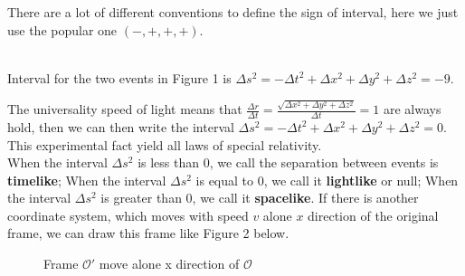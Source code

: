 \documentclass[12pt]{article}
\theoremstyle{mystyle}{\newtheorem{definition}{Definition}[section]}
\theoremstyle{mystyle}{\newtheorem{theorem}[definition]{Theorem}}
\theoremstyle{mystyle}{\newtheorem*{remark}{Remark}}
\theoremstyle{mystyle}{\newtheorem*{example}{Example}}
\theoremstyle{mystyle}{\newtheorem*{examples}{Examples}}
\theoremstyle{cstyle}{\newtheorem*{cthm}{}}
\begin{document}
\begin{remark}\leavevmode
  There are a lot of different conventions to define the sign of interval, here we just use the popular one \((-,+,+,+)\).
\end{remark}
\begin{example}\leavevmode %
  \\Interval for the two events in Figure 1 is $\Delta s^2 = - \Delta t^2 + \Delta x^2 + \Delta y^2 + \Delta z^2 = -9$.
\end{example}
The universality speed of light means that $\frac{\Delta r}{\Delta t} = \frac{\sqrt{\Delta x^2+ \Delta y^2 + \Delta z^2}}{\Delta t}=1$
are always hold, then we can then write the interval
$\Delta s^2 = - \Delta t^2 + \Delta x^2 + \Delta y^2 + \Delta z^2 = 0$. This experimental fact yield all laws of special relativity.
\\
When the interval $\Delta s^2$ is less than 0, we call the separation between events is \textbf{timelike};
When the interval $\Delta s^2$ is equal to 0, we call it \textbf{lightlike} or null;
When the interval $\Delta s^2$ is greater than 0, we call it \textbf{spacelike}.
If there is another coordinate system, which moves with speed \(v\) alone \(x\) direction of the original frame,
we can draw this frame like Figure 2 below.
\begin{figure}[ht]
  \begin{center}
    \caption[]{Frame \(\mathcal{O}'\) move alone x direction of \(\mathcal{O}\)}
  \end{center}
\end{figure}
\end{document}
